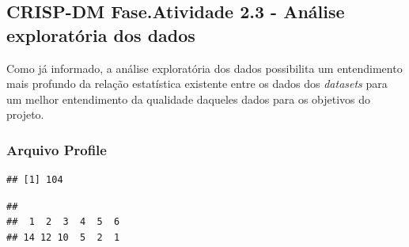 \documentclass[]{article}
\newenvironment{Shaded}{\begin{snugshade}}{\end{snugshade}}
\newcommand{\KeywordTok}[1]{\textcolor[rgb]{0.13,0.29,0.53}{\textbf{#1}}}
\newcommand{\CommentTok}[1]{\textcolor[rgb]{0.56,0.35,0.01}{\textit{#1}}}
\newcommand{\ControlFlowTok}[1]{\textcolor[rgb]{0.13,0.29,0.53}{\textbf{#1}}}
\newcommand{\OperatorTok}[1]{\textcolor[rgb]{0.81,0.36,0.00}{\textbf{#1}}}
\newcommand{\NormalTok}[1]{#1}
\begin{document}
\subsection{CRISP-DM Fase.Atividade 2.3 - Análise exploratória dos
dados}\label{crisp-dm-fase.atividade-2.3---analise-exploratoria-dos-dados}

Como já informado, a análise exploratória dos dados possibilita um
entendimento mais profundo da relação estatística existente entre os
dados dos \emph{datasets} para um melhor entendimento da qualidade
daqueles dados para os objetivos do projeto.

\subsubsection{Arquivo Profile}\label{arquivo-profile}

\begin{Shaded}
\end{Shaded}

\begin{verbatim}
## [1] 104
\end{verbatim}

\begin{Shaded}
\end{Shaded}

\begin{verbatim}
## 
##  1  2  3  4  5  6 
## 14 12 10  5  2  1
\end{verbatim}

\begin{Shaded}
\end{Shaded}
\end{document}
